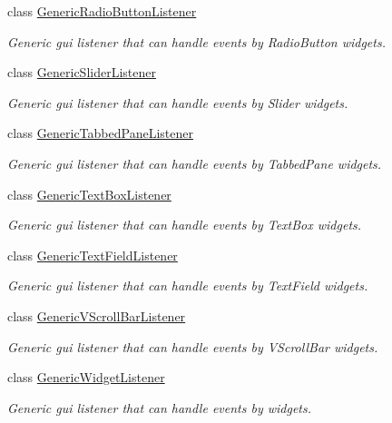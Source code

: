 \begin{DoxyCompactItemize}
class \mbox{\hyperlink{classec_1_1_generic_radio_button_listener}{Generic\+Radio\+Button\+Listener}}
\begin{DoxyCompactList}\small\item\em Generic gui listener that can handle events by Radio\+Button widgets. \end{DoxyCompactList}\item 
class \mbox{\hyperlink{classec_1_1_generic_slider_listener}{Generic\+Slider\+Listener}}
\begin{DoxyCompactList}\small\item\em Generic gui listener that can handle events by Slider widgets. \end{DoxyCompactList}\item 
class \mbox{\hyperlink{classec_1_1_generic_tabbed_pane_listener}{Generic\+Tabbed\+Pane\+Listener}}
\begin{DoxyCompactList}\small\item\em Generic gui listener that can handle events by Tabbed\+Pane widgets. \end{DoxyCompactList}\item 
class \mbox{\hyperlink{classec_1_1_generic_text_box_listener}{Generic\+Text\+Box\+Listener}}
\begin{DoxyCompactList}\small\item\em Generic gui listener that can handle events by Text\+Box widgets. \end{DoxyCompactList}\item 
class \mbox{\hyperlink{classec_1_1_generic_text_field_listener}{Generic\+Text\+Field\+Listener}}
\begin{DoxyCompactList}\small\item\em Generic gui listener that can handle events by Text\+Field widgets. \end{DoxyCompactList}\item 
class \mbox{\hyperlink{classec_1_1_generic_v_scroll_bar_listener}{Generic\+V\+Scroll\+Bar\+Listener}}
\begin{DoxyCompactList}\small\item\em Generic gui listener that can handle events by V\+Scroll\+Bar widgets. \end{DoxyCompactList}\item 
class \mbox{\hyperlink{classec_1_1_generic_widget_listener}{Generic\+Widget\+Listener}}
\begin{DoxyCompactList}\small\item\em Generic gui listener that can handle events by widgets. \end{DoxyCompactList}\item 

\end{DoxyCompactItemize}
